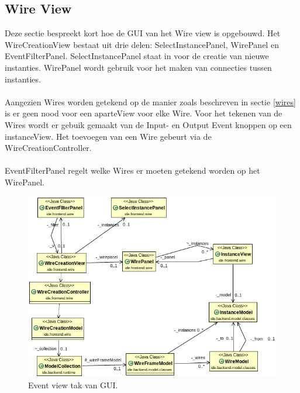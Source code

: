\documentclass[]{article}
\begin{document}
\subsection{Wire View}
\label{filter-view}
Deze sectie bespreekt kort hoe de GUI van het Wire view is opgebouwd. Het WireCreationView bestaat uit drie delen:
SelectInstancePanel, WirePanel en EventFilterPanel. SelectInstancePanel staat in voor de creatie van nieuwe instanties. WirePanel wordt gebruik voor het maken van connecties tussen instanties.\\\\
Aangezien Wires worden getekend op de manier zoals beschreven in sectie \ref{wires} is er geen nood voor een aparteView voor elke Wire. Voor het tekenen van de Wires wordt er gebuik gemaakt van de Input- en Output Event knoppen op een instanceView. Het toevoegen van een Wire gebeurt via de WireCreationController.\\\\
EventFilterPanel regelt welke Wires er moeten getekend worden op het WirePanel.
\begin{figure}[H]
  \centering 
\includegraphics[scale=0.4]{AnalyseADTAlgorithm/viewsmvc/wiretak}
  \caption{Event view tak van GUI.} \label{WireViews}
\end{figure}
\end{document}
